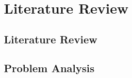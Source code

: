 \chapter{Literature Review} \label{ch:literature_review}


\section{Literature Review}

\section{Problem Analysis}






